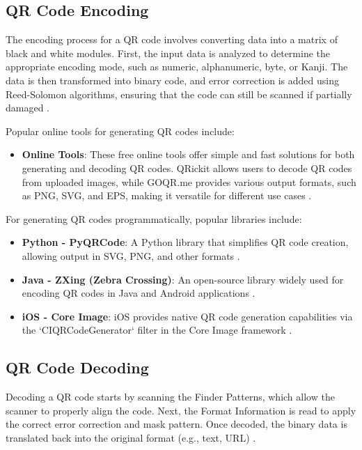 \subsection{QR Code Encoding}  
The encoding process for a QR code involves converting data into a matrix of black and white modules. First, the input data is analyzed to determine the appropriate encoding mode, such as numeric, alphanumeric, byte, or Kanji. The data is then transformed into binary code, and error correction is added using Reed-Solomon algorithms, ensuring that the code can still be scanned if partially damaged \cite{Tiwari2016}.

Popular online tools for generating QR codes include:
\begin{itemize}
	\item \textbf{Online Tools}: These free online tools offer simple and fast solutions for both generating and decoding QR codes. QRickit allows users to decode QR codes from uploaded images, while GOQR.me provides various output formats, such as PNG, SVG, and EPS, making it versatile for different use cases \cite{QRCodeMonkey2024}\cite{QRTiger2024}.
	
	
\end{itemize}

For generating QR codes programmatically, popular libraries include:
\begin{itemize}
	\item \textbf{Python - PyQRCode}: A Python library that simplifies QR code creation, allowing output in SVG, PNG, and other formats \cite{PyQRCode2024}.
	\item \textbf{Java - ZXing (Zebra Crossing)}: An open-source library widely used for encoding QR codes in Java and Android applications \cite{ZXing2024}.
	\item \textbf{iOS - Core Image}: iOS provides native QR code generation capabilities via the `CIQRCodeGenerator` filter in the Core Image framework \cite{CoreImage2024}.
\end{itemize}

\subsection{QR Code Decoding}  
\label{qr decode libraries}
Decoding a QR code starts by scanning the Finder Patterns, which allow the scanner to properly align the code. Next, the Format Information is read to apply the correct error correction and mask pattern. Once decoded, the binary data is translated back into the original format (e.g., text, URL) \cite{Tiwari2016}.

